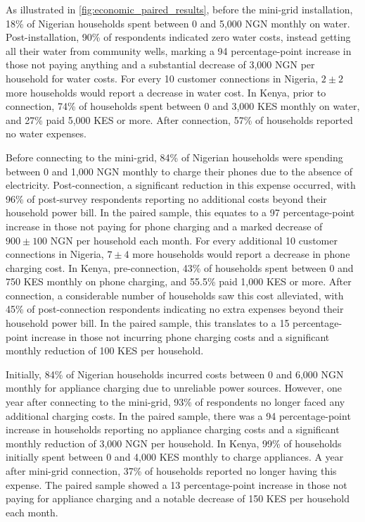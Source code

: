 As illustrated in \cref{fig:economic_paired_results}, before the mini-grid installation, 18\% of Nigerian households spent between 0 and 5,000 NGN monthly on water. Post-installation, 90\% of respondents indicated zero water costs, instead getting all their water from community wells, marking a 94 percentage-point increase in those not paying anything and a substantial decrease of 3,000 NGN per household for water costs. For every 10 customer connections in Nigeria, $2\pm2$ more households would report a decrease in water cost. In Kenya, prior to connection, 74\% of households spent between 0 and 3,000 KES monthly on water, and 27\% paid 5,000 KES or more. After connection, 57\% of households reported no water expenses.

Before connecting to the mini-grid, 84\% of Nigerian households were spending between 0 and 1,000 NGN monthly to charge their phones due to the absence of electricity. Post-connection, a significant reduction in this expense occurred, with 96\% of post-survey respondents reporting no additional costs beyond their household power bill. In the paired sample, this equates to a 97 percentage-point increase in those not paying for phone charging and a marked decrease of $900\pm100$ NGN per household each month. For every additional 10 customer connections in Nigeria, $7\pm4$ more households would report a decrease in phone charging cost. In Kenya, pre-connection, 43\% of households spent between 0 and 750 KES monthly on phone charging, and 55.5\% paid 1,000 KES or more. After connection, a considerable number of households saw this cost alleviated, with 45\% of post-connection respondents indicating no extra expenses beyond their household power bill. In the paired sample, this translates to a 15 percentage-point increase in those not incurring phone charging costs and a significant monthly reduction of 100 KES per household.

Initially, 84\% of Nigerian households incurred costs between 0 and 6,000 NGN monthly for appliance charging due to unreliable power sources. However, one year after connecting to the mini-grid, 93\% of respondents no longer faced any additional charging costs. In the paired sample, there was a 94 percentage-point increase in households reporting no appliance charging costs and a significant monthly reduction of 3,000 NGN per household. In Kenya, 99\% of households initially spent between 0 and 4,000 KES monthly to charge appliances. A year after mini-grid connection, 37\% of households reported no longer having this expense. The paired sample showed a 13 percentage-point increase in those not paying for appliance charging and a notable decrease of 150 KES per household each month.

